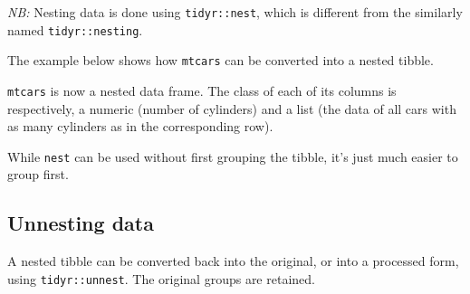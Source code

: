 \documentclass[]{book}
\newenvironment{Shaded}{}{}
\newcommand{\CommentTok}[1]{\textcolor[rgb]{0.38,0.63,0.69}{\textit{#1}}}
\newcommand{\DataTypeTok}[1]{\textcolor[rgb]{0.56,0.13,0.00}{#1}}
\newcommand{\KeywordTok}[1]{\textcolor[rgb]{0.00,0.44,0.13}{\textbf{#1}}}
\newcommand{\NormalTok}[1]{#1}
\newcommand{\OperatorTok}[1]{\textcolor[rgb]{0.40,0.40,0.40}{#1}}
\newcommand{\StringTok}[1]{\textcolor[rgb]{0.25,0.44,0.63}{#1}}
\begin{document}
\emph{NB:} Nesting data is done using \texttt{tidyr::nest}, which is different from the similarly named \texttt{tidyr::nesting}.

The example below shows how \texttt{mtcars} can be converted into a nested tibble.

\begin{Shaded}
\end{Shaded}

\texttt{mtcars} is now a nested data frame. The class of each of its columns is respectively, a numeric (number of cylinders) and a list (the data of all cars with as many cylinders as in the corresponding row).

While \texttt{nest} can be used without first grouping the tibble, it's just much easier to group first.

\hypertarget{unnesting-data}{%
\subsection{Unnesting data}\label{unnesting-data}}

A nested tibble can be converted back into the original, or into a processed form, using \texttt{tidyr::unnest}. The original groups are retained.
\end{document}
